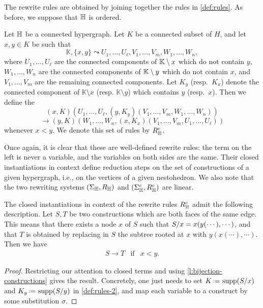 The rewrite rules are obtained by joining together the rules in \cref{def:rules}. 
As before, we suppose that ${\mathbb H}$ is ordered.

\begin{definition} 
  \label{def:rules-2}
  Let ${\mathbb H}$ be a connected hypergraph. 
  Let $K$ be a connected subset of $H$, and let $x,y \in K$ be such that
  $$\mathbb{K},\{x,y\} \leadsto U_1,\ldots,U_\ell,V_1,\ldots,V_m,W_1,\ldots,W_n,$$
  where $U_1,\ldots,U_\ell$ are the connected components of ${\mathbb K} \setminus x$ which do not contain $y$, $W_1,\ldots,W_n$ are the connected components of ${\mathbb K} \setminus y$ which do not contain $x$, and $V_1,\ldots,V_m$ are the remaining connected components. 
  Let $K_y$ (resp.\ $K_x$) denote the connected component of $\mathbb{K} \setminus x$ (resp. $\mathbb{K} \setminus y$) which contains $y$ (resp.\ $x$).
  Then we define the 
  $$(x,K)(U_1,\ldots, U_{\ell},(y,K_y)(V_1,\ldots,V_m,W_1,\ldots,W_n))$$
  $$ \longrightarrow (y,K)(W_1,\ldots,W_n,(x,K_x)(V_1,\ldots,V_m,U_1,\ldots,U_\ell))$$
  whenever $x < y$. 
  We denote this set of rules by $R_{\mathbb H}^c$.
\end{definition} 

Once again, it is clear that these are well-defined rewrite rules: the term on the left is never a variable, and the variables on both sides are the same.
Their closed instantiations in context define reduction steps on the set of constructions of a given hypergraph, i.e., on the vertices of a given nestohedron.  
We also note that the two rewriting systems $(\Sigma_{\mathbb H},R_{\mathbb H})$ and $(\Sigma_{\mathbb H}^c,R_{\mathbb H}^c)$ are linear.

\begin{lemma} 
  \label{l:instantiation-constructions}
  The closed instantiations in context of the rewrite rules $R_{\mathbb H}^c$ admit the following description.
  Let $S,T$ be two constructions which are both faces of the same edge. 
  This means that there exists a node $x$ of $S$ such that $S/x=x(y(\cdots),\cdots)$, and that $T$ is obtained by replacing in $S$ the  subtree rooted at $x$ with $y(x(\cdots),\cdots)$. 
  Then we have
  $$\begin{array}{lll}
    S \to T &  \mathrm{if} & x < y. 
  \end{array}$$
\end{lemma} 

\begin{proof}
  Restricting our attention to closed terms and using \cref{l:bijection-constructions} gives the result. 
  Concretely, one just needs to set $K\eqdef \supp(\occ{S}{x})$ and $K_y\eqdef \supp(\occ{S}{y})$ in \cref{def:rules-2}, and map each variable to a construct by some substitution $\sigma$.
\end{proof}

